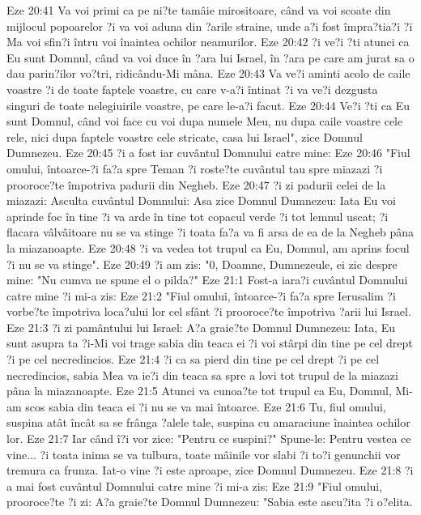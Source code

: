 Eze 20:41  Va voi primi ca pe ni?te tamâie mirositoare, când va voi scoate din mijlocul popoarelor ?i va voi aduna din ?arile straine, unde a?i fost împra?tia?i ?i Ma voi sfin?i întru voi înaintea ochilor neamurilor.
Eze 20:42  ?i ve?i ?ti atunci ca Eu sunt Domnul, când va voi duce în ?ara lui Israel, în ?ara pe care am jurat sa o dau parin?ilor vo?tri, ridicându-Mi mâna.
Eze 20:43  Va ve?i aminti acolo de caile voastre ?i de toate faptele voastre, cu care v-a?i întinat ?i va ve?i dezgusta singuri de toate nelegiuirile voastre, pe care le-a?i facut.
Eze 20:44  Ve?i ?ti ca Eu sunt Domnul, când voi face cu voi dupa numele Meu, nu dupa caile voastre cele rele, nici dupa faptele voastre cele stricate, casa lui Israel", zice Domnul Dumnezeu.
Eze 20:45  ?i a fost iar cuvântul Domnului catre mine:
Eze 20:46  "Fiul omului, întoarce-?i fa?a spre Teman ?i roste?te cuvântul tau spre miazazi ?i prooroce?te împotriva padurii din Negheb.
Eze 20:47  ?i zi padurii celei de la miazazi: Asculta cuvântul Domnului: Asa zice Domnul Dumnezeu: Iata Eu voi aprinde foc în tine ?i va arde în tine tot copacul verde ?i tot lemnul uscat; ?i flacara vâlvâitoare nu se va stinge ?i toata fa?a va fi arsa de ea de la Negheb pâna la miazanoapte.
Eze 20:48  ?i va vedea tot trupul ca Eu, Domnul, am aprins focul ?i nu se va stinge".
Eze 20:49  ?i am zis: "0, Doamne, Dumnezeule, ei zic despre mine: "Nu cumva ne spune el o pilda?"
Eze 21:1  Fost-a iara?i cuvântul Domnului catre mine ?i mi-a zis:
Eze 21:2  "Fiul omului, întoarce-?i fa?a spre Ierusalim ?i vorbe?te împotriva loca?ului lor cel sfânt ?i prooroce?te împotriva ?arii lui Israel.
Eze 21:3  ?i zi pamântului lui Israel: A?a graie?te Domnul Dumnezeu: Iata, Eu sunt asupra ta ?i-Mi voi trage sabia din teaca ei ?i voi stârpi din tine pe cel drept ?i pe cel necredincios.
Eze 21:4  ?i ca sa pierd din tine pe cel drept ?i pe cel necredincios, sabia Mea va ie?i din teaca sa spre a lovi tot trupul de la miazazi pâna la miazanoapte.
Eze 21:5  Atunci va cunoa?te tot trupul ca Eu, Domnul, Mi-am scos sabia din teaca ei ?i nu se va mai întoarce.
Eze 21:6  Tu, fiul omului, suspina atât încât sa se frânga ?alele tale, suspina cu amaraciune înaintea ochilor lor.
Eze 21:7  Iar când î?i vor zice: "Pentru ce suspini?" Spune-le: Pentru vestea ce vine... ?i toata inima se va tulbura, toate mâinile vor slabi ?i to?i genunchii vor tremura ca frunza. Iat-o vine ?i este aproape, zice Domnul Dumnezeu.
Eze 21:8  ?i a mai fost cuvântul Domnului catre mine ?i mi-a zis:
Eze 21:9  "Fiul omului, prooroce?te ?i zi: A?a graie?te Domnul Dumnezeu: "Sabia este ascu?ita ?i o?elita.
